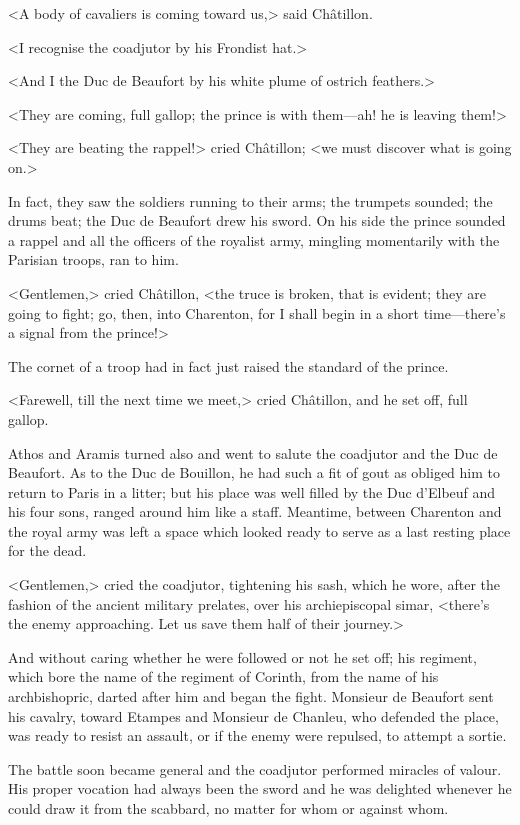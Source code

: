 <A body of cavaliers is coming toward us,> said Châtillon.

<I recognise the coadjutor by his Frondist hat.>

<And I the Duc de Beaufort by his white plume of ostrich feathers.>

<They are coming, full gallop; the prince is with them—ah! he is leaving them!>

<They are beating the rappel!> cried Châtillon; <we must discover what is going on.>

In fact, they saw the soldiers running to their arms; the trumpets sounded; the drums beat; the Duc de Beaufort drew his sword. On his side the prince sounded a rappel and all the officers of the royalist army, mingling momentarily with the Parisian troops, ran to him.

<Gentlemen,> cried Châtillon, <the truce is broken, that is evident; they are going to fight; go, then, into Charenton, for I shall begin in a short time—there's a signal from the prince!>

The cornet of a troop had in fact just raised the standard of the prince.

<Farewell, till the next time we meet,> cried Châtillon, and he set off, full gallop.

Athos and Aramis turned also and went to salute the coadjutor and the Duc de Beaufort. As to the Duc de Bouillon, he had such a fit of gout as obliged him to return to Paris in a litter; but his place was well filled by the Duc d'Elbeuf and his four sons, ranged around him like a staff. Meantime, between Charenton and the royal army was left a space which looked ready to serve as a last resting place for the dead.

<Gentlemen,> cried the coadjutor, tightening his sash, which he wore, after the fashion of the ancient military prelates, over his archiepiscopal simar, <there's the enemy approaching. Let us save them half of their journey.>

And without caring whether he were followed or not he set off; his regiment, which bore the name of the regiment of Corinth, from the name of his archbishopric, darted after him and began the fight. Monsieur de Beaufort sent his cavalry, toward Etampes and Monsieur de Chanleu, who defended the place, was ready to resist an assault, or if the enemy were repulsed, to attempt a sortie.

The battle soon became general and the coadjutor performed miracles of valour. His proper vocation had always been the sword and he was delighted whenever he could draw it from the scabbard, no matter for whom or against whom.

